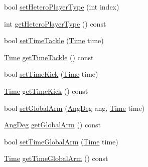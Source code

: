 \begin{DoxyCompactItemize}
bool \hyperlink{classPlayerObject_aa12cf1d604e46ccd61c8114924b870bd}{set\+Hetero\+Player\+Type} (int index)
\item 
int \hyperlink{classPlayerObject_a53fc8b930fcbc620d95fc5989bf288dc}{get\+Hetero\+Player\+Type} () const 
\item 
bool \hyperlink{classPlayerObject_ad8b1aeff152944b44cc805138dcb68de}{set\+Time\+Tackle} (\hyperlink{classTime}{Time} time)
\item 
\hyperlink{classTime}{Time} \hyperlink{classPlayerObject_a80e516083fc15dbf818c4f2c528ce97f}{get\+Time\+Tackle} () const 
\item 
bool \hyperlink{classPlayerObject_aa2254aec357b99da0d0cfd055609d477}{set\+Time\+Kick} (\hyperlink{classTime}{Time} time)
\item 
\hyperlink{classTime}{Time} \hyperlink{classPlayerObject_a2b1c6dd22798a9ba5d64d4d7071c0df3}{get\+Time\+Kick} () const 
\item 
bool \hyperlink{classPlayerObject_a78da26740a24cae0ed239d173b1fe010}{set\+Global\+Arm} (\hyperlink{Geometry_8h_a6bfe02ae9bb185092902092561ab2865}{Ang\+Deg} ang, \hyperlink{classTime}{Time} time)
\item 
\hyperlink{Geometry_8h_a6bfe02ae9bb185092902092561ab2865}{Ang\+Deg} \hyperlink{classPlayerObject_a2fdab6ebe5e659672a445940e6383d6c}{get\+Global\+Arm} () const 
\item 
bool \hyperlink{classPlayerObject_a5cc9b9c6dd889fb7bc74921d7165ebda}{set\+Time\+Global\+Arm} (\hyperlink{classTime}{Time} time)
\item 
\hyperlink{classTime}{Time} \hyperlink{classPlayerObject_abc3be47b0ce2c666237077812bf135b5}{get\+Time\+Global\+Arm} () const 
\end{DoxyCompactItemize}
